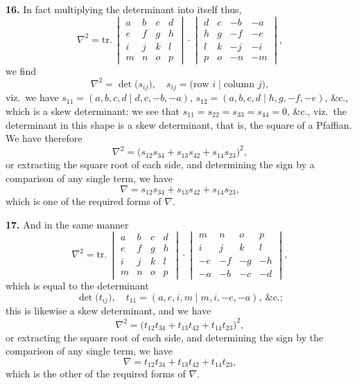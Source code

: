 \documentclass[11pt]{article}
\begin{document}
\textbf{16.} In fact multiplying the determinant into itself thus,
\[
\nabla^{2} = \mathrm{tr.}\,\begin{vmatrix} a & b & c & d \\ e & f & g & h \\ i & j & k & l \\ m & n & o & p \end{vmatrix} \cdot \begin{vmatrix} d & c & -b & -a \\ h & g & -f & -e \\ l & k & -j & -i \\ p & o & -n & -m \end{vmatrix},
\]
we find
\[
\nabla^{2} = \det\bigl(s_{ij}\bigr),\quad s_{ij} = \bigl(\text{row } i \mid \text{column } j\bigr),
\]
viz.\ we have $s_{11} = (a, b, c, d \mid d, c, -b, -a)$, $s_{12} = (a, b, c, d \mid h, g, -f, -e)$, \&c., which is a skew determinant: we see that $s_{11} = s_{22} = s_{33} = s_{44} = 0$, \&c., viz.\ the determinant in this shape is a skew determinant, that is, the square of a Pfaffian. We have therefore
\[
\nabla^{2} = \bigl(s_{12} s_{34} + s_{13} s_{42} + s_{14} s_{23}\bigr)^{2},
\]
or extracting the square root of each side, and determining the sign by a comparison of any single term, we have
\[
\nabla = s_{12} s_{34} + s_{13} s_{42} + s_{14} s_{23},
\]
which is one of the required forms of $\nabla$.

\textbf{17.} And in the same manner
\[
\nabla^{2} = \mathrm{tr.}\,\begin{vmatrix} a & b & c & d \\ e & f & g & h \\ i & j & k & l \\ m & n & o & p \end{vmatrix} \cdot \begin{vmatrix} m & n & o & p \\ i & j & k & l \\ -e & -f & -g & -h \\ -a & -b & -c & -d \end{vmatrix},
\]
which is equal to the determinant
\[
\det\bigl(t_{ij}\bigr),\quad t_{11} = (a, e, i, m \mid m, i, -e, -a),\ \text{\&c.};
\]
this is likewise a skew determinant, and we have
\[
\nabla^{2} = \bigl(t_{12} t_{34} + t_{13} t_{42} + t_{14} t_{23}\bigr)^{2},
\]
or extracting the square root of each side, and determining the sign by the comparison of any single term, we have
\[
\nabla = t_{12} t_{34} + t_{13} t_{42} + t_{14} t_{23},
\]
which is the other of the required forms of $\nabla$.
\end{document}

